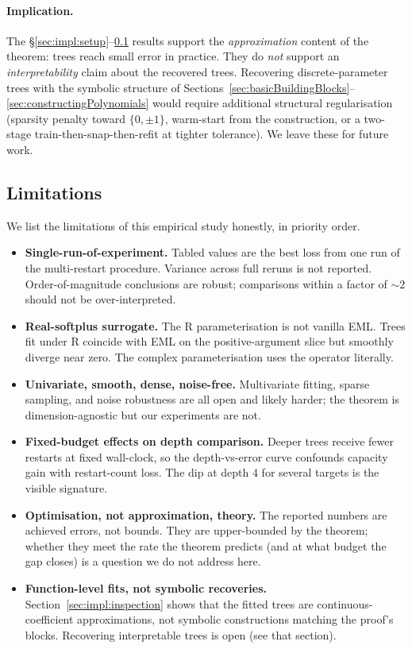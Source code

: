 \paragraph{Implication.} The §\ref{sec:impl:setup}--\ref{sec:impl:limitations}
results support the \emph{approximation} content of the theorem: trees
reach small error in practice. They do \emph{not} support an
\emph{interpretability} claim about the recovered trees. Recovering
discrete-parameter trees with the symbolic structure of
Sections~\ref{sec:basicBuildingBlocks}--\ref{sec:constructingPolynomials}
would require additional structural regularisation (sparsity penalty
toward $\{0, \pm 1\}$, warm-start from the construction, or a two-stage
train-then-snap-then-refit at tighter tolerance). We leave these for
future work.

\subsection{Limitations}
\label{sec:impl:limitations}

We list the limitations of this empirical study honestly, in priority order.

\begin{itemize}[leftmargin=*, itemsep=2pt, topsep=2pt]
\item \textbf{Single-run-of-experiment.} Tabled values are the best loss
  from one run of the multi-restart procedure. Variance across full
  reruns is not reported. Order-of-magnitude conclusions are robust;
  comparisons within a factor of $\sim 2$ should not be over-interpreted.
\item \textbf{Real-softplus surrogate.} The R parameterisation is not
  vanilla EML. Trees fit under R coincide with EML on the
  positive-argument slice but smoothly diverge near zero. The complex
  parameterisation uses the operator literally.
\item \textbf{Univariate, smooth, dense, noise-free.} Multivariate
  fitting, sparse sampling, and noise robustness are all open and likely
  harder; the theorem is dimension-agnostic but our experiments are not.
\item \textbf{Fixed-budget effects on depth comparison.} Deeper trees
  receive fewer restarts at fixed wall-clock, so the
  depth-vs-error curve confounds capacity gain with restart-count loss.
  The dip at depth $4$ for several targets is the visible signature.
\item \textbf{Optimisation, not approximation, theory.} The reported
  numbers are achieved errors, not bounds. They are upper-bounded by the
  theorem; whether they meet the rate the theorem predicts (and at what
  budget the gap closes) is a question we do not address here.
\item \textbf{Function-level fits, not symbolic recoveries.}
  Section~\ref{sec:impl:inspection} shows that the fitted trees are
  continuous-coefficient approximations, not symbolic constructions
  matching the proof's blocks. Recovering interpretable trees is open
  (see that section).
\end{itemize}
